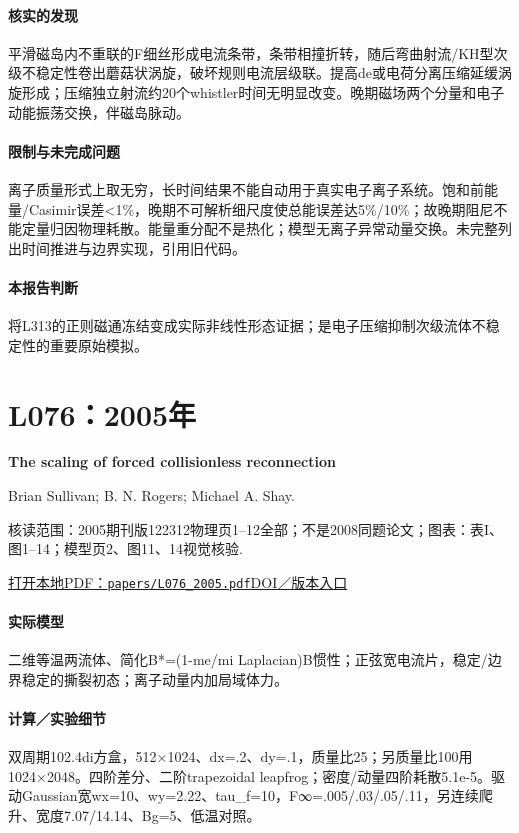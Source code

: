 \paragraph{核实的发现}平滑磁岛内不重联的F细丝形成电流条带，条带相撞折转，随后弯曲射流/KH型次级不稳定性卷出蘑菇状涡旋，破坏规则电流层级联。提高de或电荷分离压缩延缓涡旋形成；压缩独立射流约20个whistler时间无明显改变。晚期磁场两个分量和电子动能振荡交换，伴磁岛脉动。

\paragraph{限制与未完成问题}离子质量形式上取无穷，长时间结果不能自动用于真实电子离子系统。饱和前能量/Casimir误差<1\%，晚期不可解析细尺度使总能误差达5\%/10\%；故晚期阻尼不能定量归因物理耗散。能量重分配不是热化；模型无离子异常动量交换。未完整列出时间推进与边界实现，引用旧代码。

\paragraph{本报告判断}将L313的正则磁通冻结变成实际非线性形态证据；是电子压缩抑制次级流体不稳定性的重要原始模拟。

\section{L076：2005年}\label{paper:L076}

\textbf{The scaling of forced collisionless reconnection}\citep{L076}\

Brian Sullivan;  B. N. Rogers;  Michael A. Shay.

\textsf{核读范围：}2005期刊版122312物理页1–12全部；不是2008同题论文；\textsf{图表：}表I、图1–14；模型页2、图11、14视觉核验.

\href{run:papers/L076_2005.pdf}{打开本地PDF：\texttt{papers/L076\_2005.pdf}}\quad\href{https://doi.org/10.1063/1.2146910}{DOI／版本入口}

\paragraph{实际模型}二维等温两流体、简化B*=(1-me/mi Laplacian)B惯性；正弦宽电流片，稳定/边界稳定的撕裂初态；离子动量内加局域体力。

\paragraph{计算／实验细节}双周期102.4di方盒，512×1024、dx=.2、dy=.1，质量比25；另质量比100用1024×2048。四阶差分、二阶trapezoidal leapfrog；密度/动量四阶耗散5.1e-5。驱动Gaussian宽wx=10、wy=2.22、tau\_f=10，F∞=.005/.03/.05/.11，另连续爬升、宽度7.07/14.14、Bg=5、低温对照。

